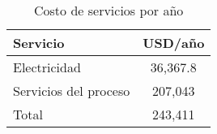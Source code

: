 \begin{table}[H]
    \centering
    \caption{Costo de servicios por año}
    \label{tab:serviciosxaño}
    
    \begin{tabular}{l|c}
    \hline 
      Servicio                    & \multicolumn{1}{l}{USD/año} \\ \hline
    Electricidad          & 36,367.8                      \\
    Servicios del proceso & 207,043                       \\ \hline
    Total                 & 243,411  \\ \hline                     
    \end{tabular}
\end{table}
    

    